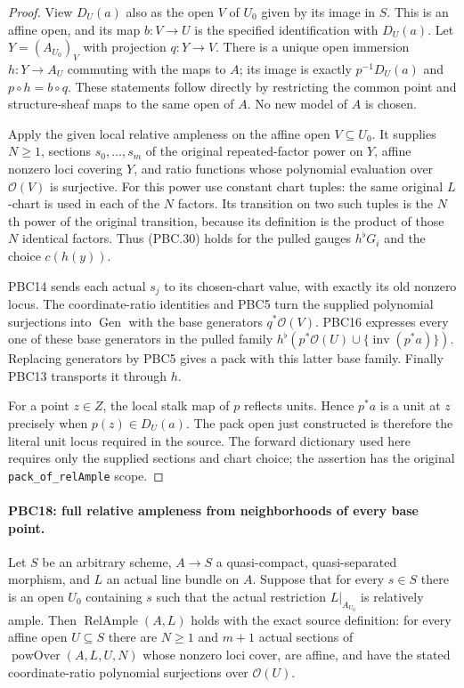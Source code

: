 \begin{proof}
View $D_U(a)$ also as the open $V$ of $U_0$ given by its image
in $S$.  This is an affine open, and its map $b:V\to U$
is the specified identification with $D_U(a)$.
Let $Y=(A_{U_0})_V$ with projection $q:Y\to V$.
There is a unique open immersion $h:Y\to A_U$ commuting with
the maps to $A$; its image is exactly $p^{-1}D_U(a)$ and
$p\circ h=b\circ q$.  These statements follow directly by
restricting the common point and structure-sheaf maps to the
same open of $A$.  No new model of $A$ is chosen.

Apply the given local relative ampleness on the affine open
$V\subseteq U_0$.  It supplies $N\ge1$, sections
$s_0,\ldots,s_m$ of the original repeated-factor power on
$Y$, affine nonzero loci covering $Y$, and ratio functions
whose polynomial evaluation over $\mathcal O(V)$ is surjective.
For this power use constant chart tuples: the same original
$L$-chart is used in each of the $N$ factors.
Its transition on two such tuples is the $N$th power of
the original transition, because its definition is the product
of those $N$ identical factors.  Thus (PBC.30) holds for the
pulled gauges $h^\flat G_i$ and the choice $c(h(y))$.

PBC14 sends each actual $s_j$ to its chosen-chart value,
with exactly its old nonzero locus.  The coordinate-ratio
identities and PBC5 turn the supplied polynomial surjections
into $\operatorname{Gen}$ with the base generators
$q^*\mathcal O(V)$.
PBC16 expresses every one of these base generators in the
pulled family
$h^\flat(p^*\mathcal O(U)\cup\{\operatorname{inv}(p^*a)\})$.
Replacing generators by PBC5 gives a pack with this latter
base family.  Finally PBC13 transports it through $h$.

For a point $z\in Z$, the local stalk map of $p$ reflects
units.  Hence $p^*a$ is a unit at $z$ precisely when
$p(z)\in D_U(a)$.  The pack open just constructed is
therefore the literal unit locus required in the source.
The forward dictionary used here requires only the supplied
sections and chart choice; the assertion has the original
\texttt{pack\_of\_relAmple} scope.
\end{proof}

\paragraph{PBC18: full relative ampleness from neighborhoods of every base point.}
\label{claim:PBC18}
Let $S$ be an arbitrary scheme, $A\to S$ a quasi-compact,
quasi-separated morphism, and $L$ an actual line bundle on
$A$.  Suppose that for every $s\in S$ there is an open
$U_0$ containing $s$ such that the actual restriction
$L|_{A_{U_0}}$ is relatively ample.  Then
$\operatorname{RelAmple}(A,L)$ holds with the exact source
definition: for every affine open $U\subseteq S$ there are
$N\ge1$ and $m+1$ actual sections of
$\operatorname{powOver}(A,L,U,N)$ whose nonzero loci cover,
are affine, and have the stated coordinate-ratio polynomial
surjections over $\mathcal O(U)$.

